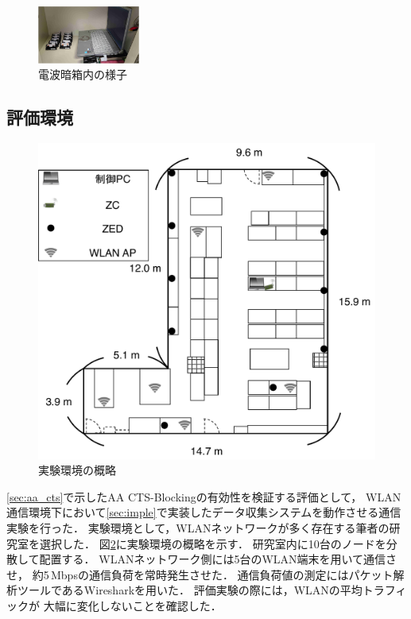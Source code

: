 \documentclass[technicalreport]{ieicej}
\begin{document}
\begin{figure}[bt]
 \centering
 \includegraphics[width=0.3\textwidth]{figure/nowave_box.pdf}
 \caption{電波暗箱内の様子}
 \label{fig:nowave_box}
\end{figure}

\subsection{評価環境}

\begin{figure}[bt]
 \centering
 \includegraphics[width=\columnwidth]{figure/fukuda_lab.pdf}
 \caption{実験環境の概略}
 \label{fig:fukuda_lab}
\end{figure}

\ref{sec:aa_cts}で示したAA CTS-Blockingの有効性を検証する評価として，
WLAN通信環境下において\ref{sec:imple}で実装したデータ収集システムを動作させる通信実験を行った．
実験環境として，WLANネットワークが多く存在する筆者の研究室を選択した．
図\ref{fig:fukuda_lab}に実験環境の概略を示す．
研究室内に10台のノードを分散して配置する．
WLANネットワーク側には5台のWLAN端末を用いて通信させ，
約5\,Mbpsの通信負荷を常時発生させた．
通信負荷値の測定にはパケット解析ツールであるWiresharkを用いた．
評価実験の際には，WLANの平均トラフィックが
大幅に変化しないことを確認した．
\end{document}
